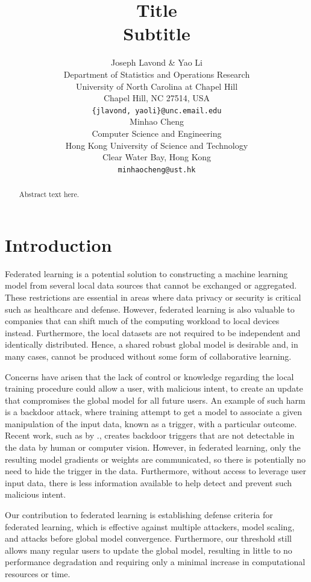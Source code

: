 \documentclass{article} %
\title{Title \\ Subtitle}
\author{%
    Joseph Lavond \& Yao Li  \\
    Department of Statistics and Operations Research \\
    University of North Carolina at Chapel Hill \\
    Chapel Hill, NC 27514, USA \\
    \texttt{\{jlavond, yaoli\}@unc.email.edu} \\
    \And
    Minhao Cheng \\
    Computer Science and Engineering \\
    Hong Kong University of Science and Technology \\
    Clear Water Bay, Hong Kong \\
    \texttt{minhaocheng@ust.hk}
}
\begin{document}
\maketitle

\begin{abstract}
Abstract text here.
\end{abstract}



\section{Introduction}

Federated learning is a potential solution to constructing a machine learning model from several local data sources that cannot be exchanged or aggregated. These restrictions are essential in areas where data privacy or security is critical such as healthcare and defense. However, federated learning is also valuable to companies that can shift much of the computing workload to local devices instead. Furthermore, the local datasets are not required to be independent and identically distributed. Hence, a shared robust global model is desirable and, in many cases, cannot be produced without some form of collaborative learning.


Concerns have arisen that the lack of control or knowledge regarding the local training procedure could allow a user, with malicious intent, to create an update that compromises the global model for all future users. An example of such harm is a backdoor attack, where training attempt to get a model to associate a given manipulation of the input data, known as a trigger, with a particular outcome. Recent work, such as by \cite{stamp-invisible}., creates backdoor triggers that are not detectable in the data by human or computer vision. However, in federated learning, only the resulting model gradients or weights are communicated, so there is potentially no need to hide the trigger in the data. Furthermore, without access to leverage user input data, there is less information available to help detect and prevent such malicious intent.

Our contribution to federated learning is establishing defense criteria for federated learning, which is effective against multiple attackers, model scaling, and attacks before global model convergence. Furthermore, our threshold still allows many regular users to update the global model, resulting in little to no performance degradation and requiring only a minimal increase in computational resources or time.
\end{document}
